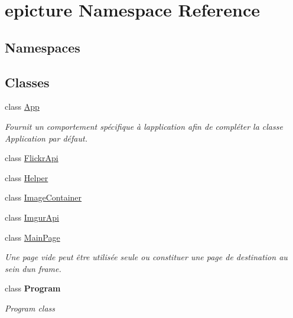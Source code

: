 \hypertarget{namespaceepicture}{}\section{epicture Namespace Reference}
\label{namespaceepicture}
\subsection*{Namespaces}
\begin{DoxyCompactItemize}
\end{DoxyCompactItemize}
\subsection*{Classes}
\begin{DoxyCompactItemize}
\item 
class \mbox{\hyperlink{classepicture_1_1_app}{App}}
\begin{DoxyCompactList}\small\item\em Fournit un comportement spécifique à l\textquotesingle{}application afin de compléter la classe Application par défaut. \end{DoxyCompactList}\item 
class \mbox{\hyperlink{classepicture_1_1_flickr_api}{Flickr\+Api}}
\item 
class \mbox{\hyperlink{classepicture_1_1_helper}{Helper}}
\item 
class \mbox{\hyperlink{classepicture_1_1_image_container}{Image\+Container}}
\item 
class \mbox{\hyperlink{classepicture_1_1_imgur_api}{Imgur\+Api}}
\item 
class \mbox{\hyperlink{classepicture_1_1_main_page}{Main\+Page}}
\begin{DoxyCompactList}\small\item\em Une page vide peut être utilisée seule ou constituer une page de destination au sein d\textquotesingle{}un frame. \end{DoxyCompactList}\item 
class {\bfseries Program}
\begin{DoxyCompactList}\small\item\em Program class \end{DoxyCompactList}\end{DoxyCompactItemize}

